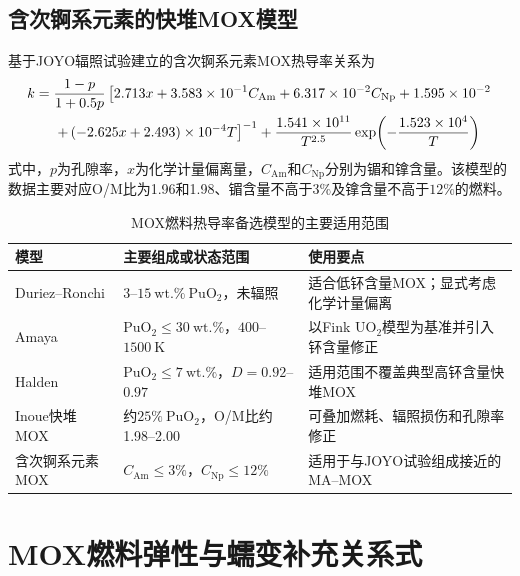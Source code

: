 \subsection{含次锕系元素的快堆MOX模型}

基于JOYO辐照试验建立的含次锕系元素MOX热导率关系为
\begin{align}
	k={}&\frac{1-p}{1+0.5p}
	\left[
	2.713x+3.583\times10^{-1}C_{\mathrm{Am}}
	+6.317\times10^{-2}C_{\mathrm{Np}}
	+1.595\times10^{-2}
	\right.\notag\\
	&\left.
	+\left(-2.625x+2.493\right)\times10^{-4}T
	\right]^{-1}
	+\frac{1.541\times10^{11}}{T^{2.5}}
	\exp\!\left(-\frac{1.523\times10^4}{T}\right)
	\label{eq:appendix_minor_actinide_mox_thermal_conductivity}
\end{align}
式中，$p$为孔隙率，$x$为化学计量偏离量，$C_{\mathrm{Am}}$和$C_{\mathrm{Np}}$分别为镅和镎含量。该模型的数据主要对应O/M比为1.96和1.98、镅含量不高于$3\%$及镎含量不高于$12\%$的燃料。

\begin{table}[htbp]
	\centering
	\small
	\renewcommand{\arraystretch}{1.20}
	\caption{MOX燃料热导率备选模型的主要适用范围}
	\label{tab:appendix_mox_thermal_conductivity_scope}
	\begin{tabularx}{\textwidth}{p{3.3cm}p{4.0cm}X}
		\toprule
		模型 & 主要组成或状态范围 & 使用要点 \\
		\midrule
		Duriez--Ronchi & $3$--$15\ \mathrm{wt.\%}\ \mathrm{PuO}_2$，未辐照 & 适合低钚含量MOX；显式考虑化学计量偏离 \\
		Amaya & $\mathrm{PuO}_2\leq30\ \mathrm{wt.\%}$，$400$--$1500\ \mathrm{K}$ & 以Fink $\mathrm{UO}_2$模型为基准并引入钚含量修正 \\
		Halden & $\mathrm{PuO}_2\leq7\ \mathrm{wt.\%}$，$D=0.92$--$0.97$ & 适用范围不覆盖典型高钚含量快堆MOX \\
		Inoue快堆MOX & 约$25\%\ \mathrm{PuO}_2$，O/M比约1.98--2.00 & 可叠加燃耗、辐照损伤和孔隙率修正 \\
		含次锕系元素MOX & $C_{\mathrm{Am}}\leq3\%$，$C_{\mathrm{Np}}\leq12\%$ & 适用于与JOYO试验组成接近的MA--MOX \\
		\bottomrule
	\end{tabularx}
\end{table}

\section{MOX燃料弹性与蠕变补充关系式}
\label{app:mox_mechanical_correlations}

